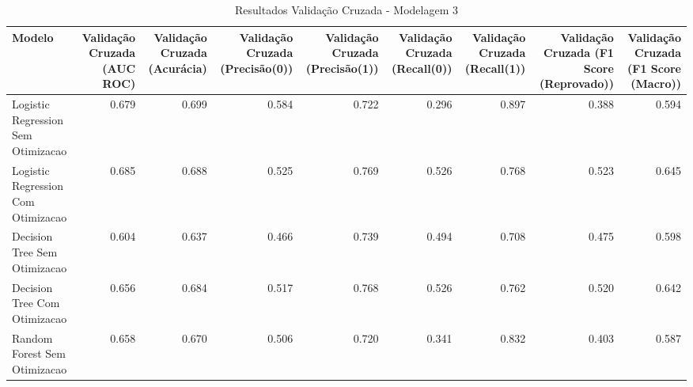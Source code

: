 \begin{table}[H] %
    \centering
    \caption{Resultados Validação Cruzada - Modelagem 3}
    \label{tab:resultados_cv_modelagem_3}
    \renewcommand{\arraystretch}{1.25} %
    \begin{adjustwidth}{ -1in }{ -1in } %
    \centering %
    \small %
    \begin{tabular}{lrrrrrrrr}
\toprule
                            Modelo &  Validação Cruzada (AUC ROC) &  Validação Cruzada (Acurácia) &  Validação Cruzada (Precisão(0)) &  Validação Cruzada (Precisão(1)) &  Validação Cruzada (Recall(0)) &  Validação Cruzada (Recall(1)) &  Validação Cruzada (F1 Score (Reprovado)) &  Validação Cruzada (F1 Score (Macro)) \\
\midrule
Logistic Regression Sem Otimizacao &                        0.679 &                         0.699 &                            0.584 &                            0.722 &                          0.296 &                          0.897 &                                     0.388 &                                 0.594 \\
Logistic Regression Com Otimizacao &                        0.685 &                         0.688 &                            0.525 &                            0.769 &                          0.526 &                          0.768 &                                     0.523 &                                 0.645 \\
      Decision Tree Sem Otimizacao &                        0.604 &                         0.637 &                            0.466 &                            0.739 &                          0.494 &                          0.708 &                                     0.475 &                                 0.598 \\
      Decision Tree Com Otimizacao &                        0.656 &                         0.684 &                            0.517 &                            0.768 &                          0.526 &                          0.762 &                                     0.520 &                                 0.642 \\
      Random Forest Sem Otimizacao &                        0.658 &                         0.670 &                            0.506 &                            0.720 &                          0.341 &                          0.832 &                                     0.403 &                                 0.587 \\

\end{tabular}
\end{adjustwidth}
\end{table}
